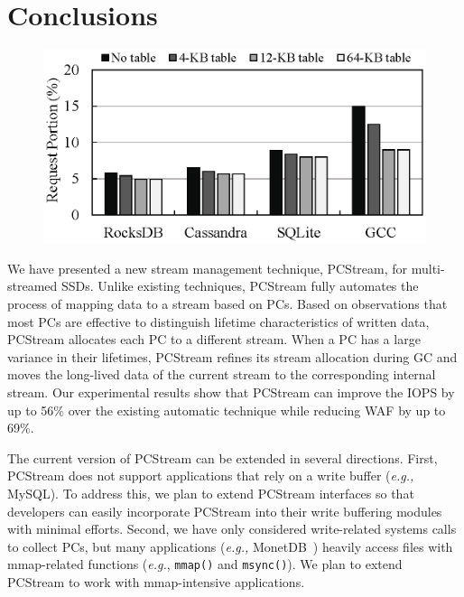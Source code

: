 \vspace{-10pt}
\section{Conclusions}
\vspace{-5pt}

\begin{figure}[t]
	\centering
	\includegraphics[width=0.87\linewidth]{figure/pctable}
	\caption{}
	\vspace{-5pt}
	\label{fig:pctable}
	\vspace{-10pt}
\end{figure}


We have presented a new stream management technique, \textsf{\small PCStream},
for multi-streamed SSDs.  Unlike existing techniques, \textsf{\small PCStream}
fully automates the process of mapping data to a stream based on PCs.  Based on
observations that most PCs are effective to distinguish lifetime
characteristics of written data, \textsf{\small PCStream} allocates each PC to
a different stream.  When a PC has a large variance in their lifetimes,
\textsf{\small PCStream} refines its stream allocation during GC and moves the
long-lived data of the current stream to the corresponding internal stream.
Our experimental results show that \textsf{\small PCStream} can improve the
IOPS by up to 56\% over the existing automatic technique while reducing WAF by
up to 69\%. 

The current version of \textsf{\small PCStream} can be extended in several
directions.  First, \textsf{\small PCStream} does not support applications that
rely on a write buffer ({\it e.g.,} MySQL). To address this, we plan to extend
\textsf{\small PCStream} interfaces so that developers can easily incorporate
\textsf{\small PCStream} into their write buffering modules with minimal
efforts.  Second, we have only considered write-related systems calls to
collect PCs, but many applications ({\it e.g.,} MonetDB~\cite{MonetDB}) heavily
access files with mmap-related functions ({\it e.g.}, \texttt{mmap()} and
\texttt{msync()}).  We plan to extend \textsf{\small PCStream} to work with
mmap-intensive applications. 


